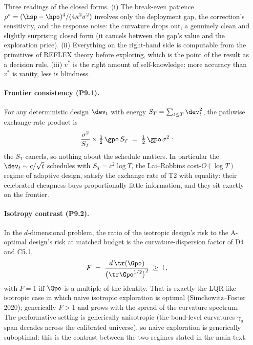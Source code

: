 Three readings of the closed forms. (i) The break-even patience
$\rho^{*} = (\hsp-\hpo)^4/(4\kappa^2\sigma^2)$ involves only the
deployment gap, the correction's sensitivity, and the response noise:
the curvature drops out, a genuinely clean and slightly surprising
closed form (it cancels between the gap's value and the exploration
price). (ii) Everything on the right-hand side is computable from the
primitives of REFLEX theory before exploring, which is the point of the
result as a decision rule. (iii) $v^{*}$ is the right amount of
self-knowledge: more accuracy than $v^{*}$ is vanity, less is blindness.

\paragraph{Frontier consistency (P9.1).}
For any deterministic design $\dev_t$ with energy
$S_T = \sum_{t\le T}\dev_t^2$, the pathwise exchange-rate product is
\begin{equation*}
\frac{\sigma^2}{S_T} \times \tfrac{1}{2}\,\gpo\, S_T
\;=\; \tfrac{1}{2}\,\gpo\,\sigma^2 :
\end{equation*}
the $S_T$ cancels, so nothing about the schedule matters. In particular
the $\dev_t \sim c/\sqrt{t}$ schedules with $S_T = c^2 \log T$, the
Lai--Robbins cost-$O(\log T)$ regime of adaptive design, satisfy the
exchange rate of T2 with equality: their celebrated cheapness buys
proportionally little information, and they sit exactly on the frontier.

\paragraph{Isotropy contrast (P9.2).}
In the $d$-dimensional problem, the ratio of the isotropic design's risk
to the A-optimal design's risk at matched budget is the
curvature-dispersion factor of D4 and C5.1,
\begin{equation*}
F \;=\; \frac{d\,\tr(\Gpo)}{\big(\tr \Gpo^{1/2}\big)^{2}} \;\ge\; 1,
\end{equation*}
with $F = 1$ iff $\Gpo$ is a multiple of the identity. That is exactly
the LQR-like isotropic case in which naive isotropic exploration is
optimal (Simchowitz--Foster 2020); generically $F > 1$ and grows with
the spread of the curvature spectrum. The performative setting is
generically anisotropic (the bond-level curvatures $\gamma_a$ span
decades across the calibrated universe), so naive exploration is
generically suboptimal: this is the contrast between the two regimes
stated in the main text.

